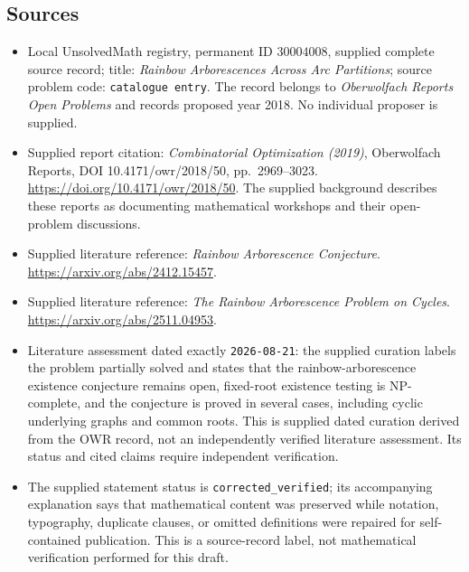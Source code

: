 \documentclass[11pt]{article}
\begin{document}
\subsection{Sources}
\begin{itemize}
\item Local UnsolvedMath registry, permanent ID \(30004008\), supplied complete source record; title: \emph{Rainbow Arborescences Across Arc Partitions}; source problem code: \texttt{catalogue entry}. The record belongs to \emph{Oberwolfach Reports Open Problems} and records proposed year 2018. No individual proposer is supplied.
\item Supplied report citation: \emph{Combinatorial Optimization (2019)}, Oberwolfach Reports, DOI 10.4171/owr/2018/50, pp.~2969--3023. \url{https://doi.org/10.4171/owr/2018/50}. The supplied background describes these reports as documenting mathematical workshops and their open-problem discussions.
\item Supplied literature reference: \emph{Rainbow Arborescence Conjecture}. \url{https://arxiv.org/abs/2412.15457}.
\item Supplied literature reference: \emph{The Rainbow Arborescence Problem on Cycles}. \url{https://arxiv.org/abs/2511.04953}.
\item Literature assessment dated exactly \texttt{2026-08-21}: the supplied curation labels the problem partially solved and states that the rainbow-arborescence existence conjecture remains open, fixed-root existence testing is NP-complete, and the conjecture is proved in several cases, including cyclic underlying graphs and common roots. This is supplied dated curation derived from the OWR record, not an independently verified literature assessment. Its status and cited claims require independent verification.
\item The supplied statement status is \texttt{corrected\_verified}; its accompanying explanation says that mathematical content was preserved while notation, typography, duplicate clauses, or omitted definitions were repaired for self-contained publication. This is a source-record label, not mathematical verification performed for this draft.
\end{itemize}
\end{document}
